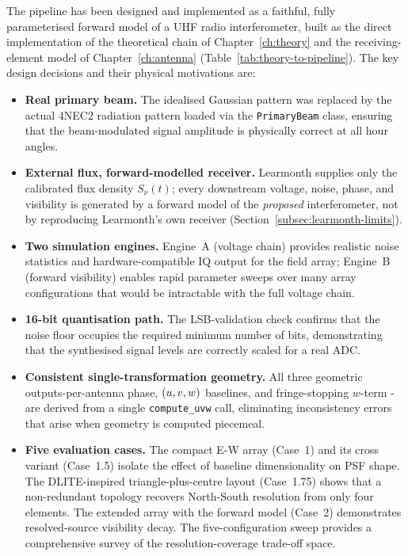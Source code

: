 The pipeline has been designed and implemented as a faithful, fully
parameterised forward model of a UHF radio interferometer, built as the
direct implementation of the theoretical chain of Chapter~\ref{ch:theory}
and the receiving-element model of Chapter~\ref{ch:antenna}
(Table~\ref{tab:theory-to-pipeline}). The key design decisions and their
physical motivations are:
\begin{itemize}[leftmargin=*]
  \item \textbf{Real primary beam.} The idealised Gaussian pattern was replaced
  by the actual 4NEC2 radiation pattern loaded via the \texttt{PrimaryBeam}
  class, ensuring that the beam-modulated signal amplitude is physically correct
  at all hour angles.

  \item \textbf{External flux, forward-modelled receiver.} Learmonth supplies
  only the calibrated flux density $S_\nu(t)$; every downstream voltage, noise,
  phase, and visibility is generated by a forward model of the \emph{proposed}
  interferometer, not by reproducing Learmonth's own receiver
  (Section~\ref{subsec:learmonth-limits}).

  \item \textbf{Two simulation engines.} Engine~A (voltage chain) provides
  realistic noise statistics and hardware-compatible IQ output for the field
  array; Engine~B (forward visibility) enables rapid parameter sweeps over many
  array configurations that would be intractable with the full voltage chain.

  \item \textbf{16-bit quantisation path.} The LSB-validation check confirms
  that the noise floor occupies the required minimum number of bits,
  demonstrating that the synthesised signal levels are correctly scaled for
  a real ADC.

  \item \textbf{Consistent single-transformation geometry.} All three geometric
  outputs-per-antenna phase, $(u,v,w)$ baselines, and fringe-stopping $w$-term
  -are derived from a single \texttt{compute\_uvw} call, eliminating
  inconsistency errors that arise when geometry is computed piecemeal.

  \item \textbf{Five evaluation cases.} The compact E-W array (Case~1) and its
  cross variant (Case~1.5) isolate the effect of baseline dimensionality on PSF
  shape. The DLITE-inspired triangle-plus-centre layout (Case~1.75) shows that a
  non-redundant topology recovers North-South resolution from only four
  elements. The extended array with the forward model (Case~2) demonstrates
  resolved-source visibility decay. The five-configuration sweep provides a
  comprehensive survey of the resolution-coverage trade-off space.
\end{itemize}

